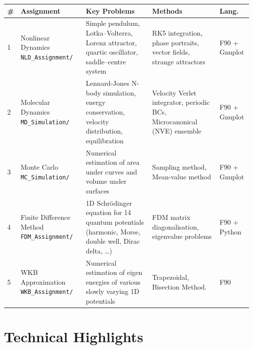 \documentclass[11pt, a4paper]{article}
\begin{document}
\renewcommand{\arraystretch}{1.45}
\begin{tabularx}{\linewidth}{C{0.5cm} L{3.2cm} L{4.8cm} L{3.5cm} C{1.2cm}}
  \toprule
  \textbf{\#} & \textbf{Assignment} & \textbf{Key Problems} & \textbf{Methods} & \textbf{Lang.} \\
  \midrule

  1 &
  Nonlinear Dynamics \newline\texttt{NLD\_Assignment/} &
  Simple pendulum, Lotka--Volterra,
  Lorenz attractor, quartic oscillator,
  saddle--centre system &
  RK5 integration, phase portraits,
  vector fields, strange attractors &
  F90 + Gnuplot \\

  2 &
  Molecular Dynamics \newline\texttt{MD\_Simulation/} &
  Lennard-Jones N-body simulation,
  energy conservation, velocity
  distribution, equilibration &
  Velocity Verlet integrator,
  periodic BCs, Microcanonical (NVE) ensemble &
  F90 + Gnuplot \\

  3 &
  Monte Carlo \newline\texttt{MC\_Simulation/} &
  Numerical estimation of area under curves and volume under surfaces &
  Sampling method, Mean-value method &
  F90 + Gnuplot \\

  4 &
  Finite Difference Method \newline\texttt{FDM\_Assignment/} &
  1D Schr{\"o}dinger equation for
  14 quantum potentials (harmonic,
  Morse, double well, Dirac delta, \ldots) &
  FDM matrix diagonalisation,
  eigenvalue problems &
  F90 + Python \\

  5 &
  WKB Approximation \newline\texttt{WKB\_Assignment/} &
  Numerical estimation of eigen energies of various slowly varying 1D potentials &
  Trapezoidal, Bisection Method. &
  F90  \\

  \bottomrule
\end{tabularx}

\vspace{0.5em}

\section{Technical Highlights}
\end{document}
